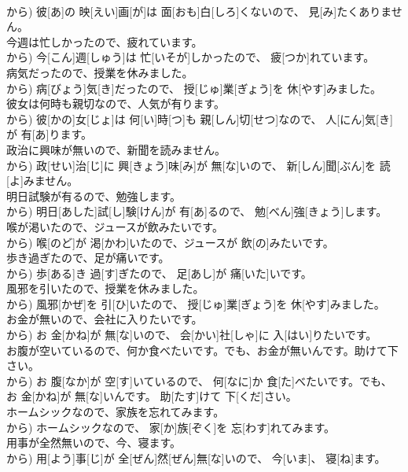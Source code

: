 \documentclass[8pt]{extreport}
\begin{document}
\begin{CJK}{UTF8}{min}
\\	から)	彼[あ]の 映[えい]画[が]は 面[おも]白[しろ]くないので、 見[み]たくありません。
\\	今週は忙しかったので、疲れています。	
\\	から)	今[こん]週[しゅう]は 忙[いそが]しかったので、 疲[つか]れています。
\\	病気だったので、授業を休みました。	
\\	から)	病[びょう]気[き]だったので、 授[じゅ]業[ぎょう]を 休[やす]みました。
\\	彼女は何時も親切なので、人気が有ります。	
\\	から)	彼[かの]女[じょ]は 何[い]時[つ]も 親[しん]切[せつ]なので、 人[にん]気[き]が 有[あ]ります。
\\	政治に興味が無いので、新聞を読みません。	
\\	から)	政[せい]治[じ]に 興[きょう]味[み]が 無[な]いので、 新[しん]聞[ぶん]を 読[よ]みません。
\\	明日試験が有るので、勉強します。	
\\	から)	明日[あした]試[し]験[けん]が 有[あ]るので、 勉[べん]強[きょう]します。
\\	喉が渇いたので、ジュースが飲みたいです。	
\\	から)	喉[のど]が 渇[かわ]いたので、ジュースが 飲[の]みたいです。
\\	歩き過ぎたので、足が痛いです。	
\\	から)	歩[ある]き 過[す]ぎたので、 足[あし]が 痛[いた]いです。
\\	風邪を引いたので、授業を休みました。	
\\	から)	風邪[かぜ]を 引[ひ]いたので、 授[じゅ]業[ぎょう]を 休[やす]みました。
\\	お金が無いので、会社に入りたいです。	
\\	から)	お 金[かね]が 無[な]いので、 会[かい]社[しゃ]に 入[はい]りたいです。
\\	お腹が空いているので、何か食べたいです。でも、お金が無いんです。助けて下さい。	
\\	から)	お 腹[なか]が 空[す]いているので、 何[なに]か 食[た]べたいです。でも、お 金[かね]が 無[な]いんです。 助[たす]けて 下[くだ]さい。
\\	ホームシックなので、家族を忘れてみます。	
\\	から)	ホームシックなので、 家[か]族[ぞく]を 忘[わす]れてみます。
\\	用事が全然無いので、今、寝ます。	
\\	から)	用[よう]事[じ]が 全[ぜん]然[ぜん]無[な]いので、 今[いま]、 寝[ね]ます。

\end{CJK}
\end{document}
